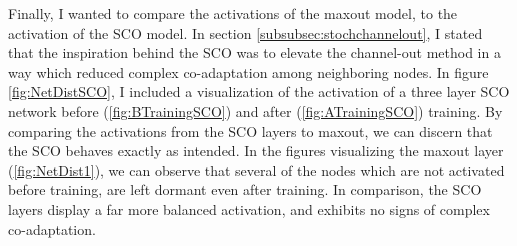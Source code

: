 Finally, I wanted to compare the activations of the maxout model, to the activation of the \ac{SCO} model. In section \ref{subsubsec:stochchannelout},
I stated that the inspiration behind the \ac{SCO} was to elevate the channel-out method in a way which reduced complex co-adaptation among neighboring
nodes. In figure \ref{fig:NetDistSCO}, I included a visualization of the activation of a three layer \ac{SCO} network before (\ref{fig:BTrainingSCO}) 
and after (\ref{fig:ATrainingSCO}) training. By comparing the activations from the \ac{SCO} layers to maxout, we can discern that the \ac{SCO} behaves
exactly as intended. In the figures visualizing the maxout layer (\ref{fig:NetDist1}), we can observe that several of the nodes which are not activated 
before training, are left dormant even after training. In comparison, the \ac{SCO} layers display a far more balanced activation, and exhibits no signs 
of complex co-adaptation. 
